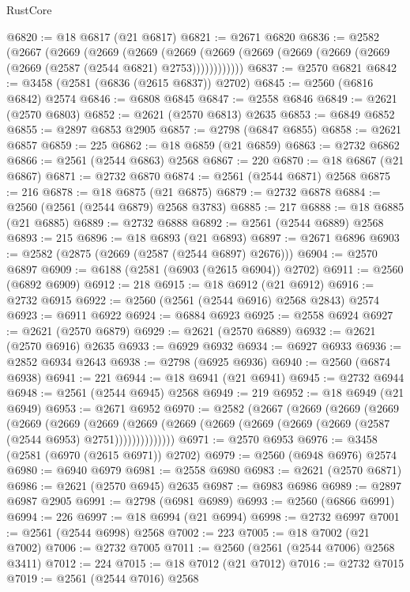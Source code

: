 \begin{lexlean}{RustCore}
\begin{coremodule}
@6820 := @18 @6817 (@21 @6817)
@6821 := @2671 @6820
@6836 := @2582
    (@2667
      (@2669
        (@2669
          (@2669
            (@2669 (@2669 (@2669 (@2669 (@2669 (@2669 (@2669 (@2587 (@2544 @6821) @2753))))))))))))
@6837 := @2570 @6821
@6842 := @3458 (@2581 (@6836 (@2615 @6837)) @2702)
@6845 := @2560 (@6816 @6842) @2574
@6846 := @6808 @6845
@6847 := @2558 @6846
@6849 := @2621 (@2570 @6803)
@6852 := @2621 (@2570 @6813) @2635
@6853 := @6849 @6852
@6855 := @2897 @6853 @2905
@6857 := @2798 (@6847 @6855)
@6858 := @2621 @6857
@6859 := 225
@6862 := @18 @6859 (@21 @6859)
@6863 := @2732 @6862
@6866 := @2561 (@2544 @6863) @2568
@6867 := 220
@6870 := @18 @6867 (@21 @6867)
@6871 := @2732 @6870
@6874 := @2561 (@2544 @6871) @2568
@6875 := 216
@6878 := @18 @6875 (@21 @6875)
@6879 := @2732 @6878
@6884 := @2560 (@2561 (@2544 @6879) @2568 @3783)
@6885 := 217
@6888 := @18 @6885 (@21 @6885)
@6889 := @2732 @6888
@6892 := @2561 (@2544 @6889) @2568
@6893 := 215
@6896 := @18 @6893 (@21 @6893)
@6897 := @2671 @6896
@6903 := @2582 (@2875 (@2669 (@2587 (@2544 @6897) @2676)))
@6904 := @2570 @6897
@6909 := @6188 (@2581 (@6903 (@2615 @6904)) @2702)
@6911 := @2560 (@6892 @6909)
@6912 := 218
@6915 := @18 @6912 (@21 @6912)
@6916 := @2732 @6915
@6922 := @2560 (@2561 (@2544 @6916) @2568 @2843) @2574
@6923 := @6911 @6922
@6924 := @6884 @6923
@6925 := @2558 @6924
@6927 := @2621 (@2570 @6879)
@6929 := @2621 (@2570 @6889)
@6932 := @2621 (@2570 @6916) @2635
@6933 := @6929 @6932
@6934 := @6927 @6933
@6936 := @2852 @6934 @2643
@6938 := @2798 (@6925 @6936)
@6940 := @2560 (@6874 @6938)
@6941 := 221
@6944 := @18 @6941 (@21 @6941)
@6945 := @2732 @6944
@6948 := @2561 (@2544 @6945) @2568
@6949 := 219
@6952 := @18 @6949 (@21 @6949)
@6953 := @2671 @6952
@6970 := @2582
    (@2667
      (@2669
        (@2669
          (@2669
            (@2669
              (@2669
                (@2669
                  (@2669 (@2669 (@2669 (@2669 (@2669 (@2669 (@2587 (@2544 @6953) @2751))))))))))))))
@6971 := @2570 @6953
@6976 := @3458 (@2581 (@6970 (@2615 @6971)) @2702)
@6979 := @2560 (@6948 @6976) @2574
@6980 := @6940 @6979
@6981 := @2558 @6980
@6983 := @2621 (@2570 @6871)
@6986 := @2621 (@2570 @6945) @2635
@6987 := @6983 @6986
@6989 := @2897 @6987 @2905
@6991 := @2798 (@6981 @6989)
@6993 := @2560 (@6866 @6991)
@6994 := 226
@6997 := @18 @6994 (@21 @6994)
@6998 := @2732 @6997
@7001 := @2561 (@2544 @6998) @2568
@7002 := 223
@7005 := @18 @7002 (@21 @7002)
@7006 := @2732 @7005
@7011 := @2560 (@2561 (@2544 @7006) @2568 @3411)
@7012 := 224
@7015 := @18 @7012 (@21 @7012)
@7016 := @2732 @7015
@7019 := @2561 (@2544 @7016) @2568

\end{coremodule}
\end{lexlean}
